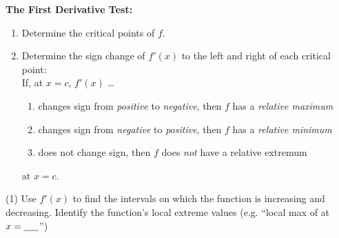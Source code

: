 \documentclass[../mathNotesPreamble]{subfiles}
\begin{document}
  \begin{thmBox*}
    \textbf{The First Derivative Test:}
    \begin{enumerate}
      \item Determine the critical points of $f$.
      \item Determine the sign change of $f'(x)$ to the left and right of each critical point:\\
        If, at $x=c$, $f'(x)$ \dots
        \begin{enumerate}
          \item changes sign from \emph{positive} to \emph{negative}, then $f$ has a \emph{relative maximum} \hfill
          \item changes sign from \emph{negative} to \emph{positive}, then $f$ has a \emph{relative minimum} \hfill
          \item does not change sign, then $f$ does \emph{not} have a relative extremum
        \end{enumerate}
        at $x=c$.
    \end{enumerate}
  \end{thmBox*}

  \begin{extasks}[after-item-skip=\stretch{1}](1)
    \task Use $f'(x)$ to find the intervals on which the function is increasing and decreasing.
    \task Identify the function's local extreme values \hfill
      (e.g. ``local max of \underline{\hspace*{15pt}} at $x=\underline{\hspace*{15pt}}$'')
  \end{extasks}
  \pagebreak
\end{document}
